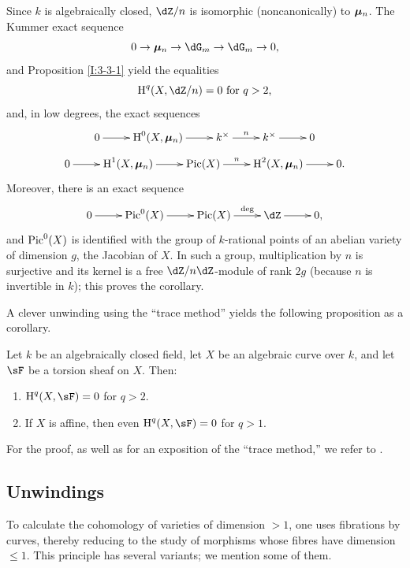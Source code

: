 Since $k$ is algebraically closed, $\dZ/n$ is isomorphic
(noncanonically) to ${\bm\mu}_n$. The Kummer exact sequence
\[
  0 \to \dmu_n \to \dG_m \to \dG_m \to 0\text{,}
\]
and Proposition \ref{I:3-3-1} yield the equalities
\[
  \h^q(X,\dZ/n) = 0 \text{ for $q>2$,}
\]
and, in low degrees, the exact sequences
\[\xymatrix{
  0 \ar[r]
    & \h^0(X,\dmu_n) \ar[r]
    & k^\times \ar[r]^-n
    & k^\times \ar[r]
    & 0
}\]
\[\xymatrix{
  0 \ar[r]
    & \h^1(X,\dmu_n) \ar[r]
    & \pic(X) \ar[r]^-n
    & \h^2(X,\dmu_n) \ar[r]
    & 0\text{.}
}\]
Moreover, there is an exact sequence
\[\xymatrix{
  0 \ar[r]
    & \pic^0(X) \ar[r]
    & \pic(X) \ar[r]^-{\deg}
    & \dZ \ar[r]
    & 0 \text{,}
}\]
and $\operatorname{Pic}^0(X)$ is identified with the group of $k$-rational points of
an abelian variety of dimension $g$, the Jacobian of $X$. In such a
group, multiplication by $n$ is surjective and its kernel is a free
$\dZ/n\dZ$-module of rank $2g$ (because $n$ is invertible in $k$);
this proves the corollary.

A clever unwinding using the “trace method” yields the following
proposition as a corollary.

\begin{proposition}\label{I:3-3-6}
Let $k$ be an algebraically closed field, let $X$ be an algebraic curve
over $k$, and let $\sF$ be a torsion sheaf on $X$. Then:
\begin{enumerate}[\indent i)]
  \item $\h^q(X,\sF)=0$ for $q>2$.
  \item If $X$ is affine, then even $\h^q(X,\sF)=0$ for $q>1$.
\end{enumerate}
\end{proposition}

For the proof, as well as for an exposition of the “trace method,” we
refer to \cite[IX 5]{sga4}.

\subsection{Unwindings}\label{I:3-4}

To calculate the cohomology of varieties of dimension $>1$, one uses
fibrations by curves, thereby reducing to the study of morphisms whose
fibres have dimension $\leqslant1$. This principle has several variants;
we mention some of them.

\subsubsection{}\label{I:3-4-1}

